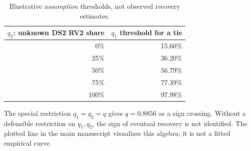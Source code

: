 \documentclass[10pt,a4paper]{article}
\begin{document}
\begin{table}[h!]
\centering\small
\caption{Illustrative \emph{assumption} thresholds, not observed recovery estimates.}
\begin{tabular}{rr}
\toprule $q_2$: unknown DS2 RV2 share & $q_1$ threshold for a tie \\ \midrule
0\% & 15.60\%\\
25\% & 36.20\%\\
50\% & 56.79\%\\
75\% & 77.39\%\\
100\% & 97.98\%\\\bottomrule
\end{tabular}
\end{table}
The special restriction $q_1=q_2=q$ gives $q=0.8856$ as a sign crossing. Without a defensible restriction on $q_1,q_2$, the sign of eventual recovery is not identified. The plotted line in the main manuscript visualizes this algebra; it is not a fitted empirical curve.
\end{document}
